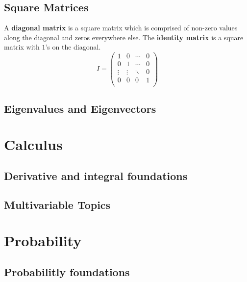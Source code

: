 \documentclass[10pt,a4paper,fleqn]{article} %
\begin{document}
\subsection{Square Matrices} %
A \textbf{diagonal matrix} is a square matrix which is comprised of non-zero values
along the diagonal and zeros everywhere else.
The \textbf{identity matrix} is a square matrix with $1$'s on the diagonal.
\begin{equation}
    I = \begin{pmatrix}
        1 & 0 & \cdots & 0 \\
        0 & 1 & \cdots & 0 \\
        \vdots & \vdots & \ddots & 0 \\
        0 & 0 & 0 & 1 \\
    \end{pmatrix}    
\end{equation}

\subsection{Eigenvalues and Eigenvectors} %


\section{Calculus} %

\subsection{Derivative and integral foundations} %

\subsection{Multivariable Topics} %


\section{Probability} %

\subsection{Probabilitly foundations} %
\end{document}
